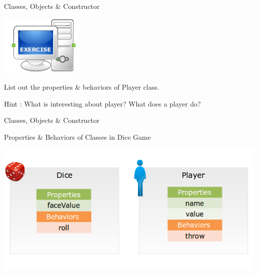 \documentclass[14pt]{beamer}
\begin{document}
          \begin{frame}{Classes, Objects \& Constructor}
          \begin{center}
                  \includegraphics[scale=0.3]{COJ-M01-S03-Image6.png}
                    \end{center}
                    List out the properties \& behaviors of Player class.

                    Hint : 
                    What is interesting about player?
                    What does a player do?
                \end{frame}
\begin{frame}{Classes, Objects \& Constructor}
\begin{center}
Properties \& Behaviors of Classes in Dice Game
\end{center}
\begin{center}
\includegraphics[scale=0.5]{COJ-M01-S03-Image7.png}
\end{center}
\end{frame}
\end{document}

